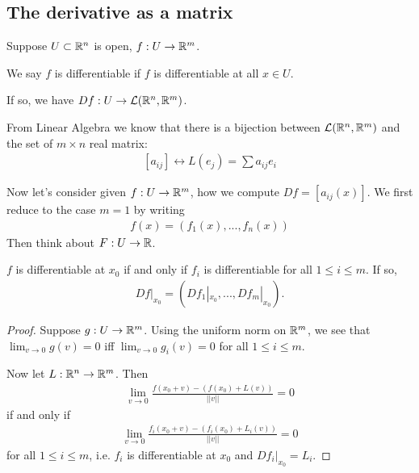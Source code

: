 \documentclass[a4paper]{article}
\begin{document}
\subsection{The derivative as a matrix}
Suppose $U \subset \mathbb{R}^n$ is open, $f:U \to \mathbb{R}^m$.

We say $f$ is differentiable if $f$ is differentiable at all $x \in U$.

If so, we have $Df:U \to \mathcal{L}(\mathbb{R}^n,\mathbb{R}^m)$.

From Linear Algebra we know that there is a bijection between $\mathcal{L}(\mathbb{R}^n,\mathbb{R}^m)$ and the set of $m\times n$ real matrix:
\begin{equation*}
\begin{aligned}
[a_{ij}] \longleftrightarrow L(e_j) = \sum a_{ij} e_i
\end{aligned}
\end{equation*}

Now let's consider given $f:U \to \mathbb{R}^m$, how we compute $Df=[a_{ij}(x)]$. We first reduce to the case $m=1$ by writing
\begin{equation*}
\begin{aligned}
f(x) = (f_1(x),...,f_n(x))
\end{aligned}
\end{equation*}
Then think about $F:U \to \mathbb{R}$.

\begin{prop}
$f$ is differentiable at $x_0$ if and only if $f_i$ is differentiable for all $1\leq i \leq m$. If so,
\begin{equation*}
\begin{aligned}
Df|_{x_0} = (Df_1|_{x_0},...,Df_m|_{x_0}).
\end{aligned}
\end{equation*}
\begin{proof}
Suppose $g: U \to \mathbb{R}^m$. Using the uniform norm on $\mathbb{R}^m$, we see that $\lim_{v\to 0} g(v) = 0$ iff $\lim_{v \to 0} g_i(v) = 0$ for all $1 \leq i \leq m$.

Now let $L: \mathbb{R}^n \to \mathbb{R}^m$. Then
\begin{equation*}
\begin{aligned}
\lim_{v\to 0} \frac{f(x_0+v)-(f(x_0)+L(v))}{||v||} = 0
\end{aligned}
\end{equation*}
if and only if
\begin{equation*}
\begin{aligned}
\lim_{v\to 0} \frac{f_i(x_0+v)-(f_i(x_0)+L_i(v))}{||v||} = 0
\end{aligned}
\end{equation*}
for all $1 \leq i \leq m$, i.e. $f_i$ is differentiable at $x_0$ and $Df_i|_{x_0} = L_i$.
\end{proof}
\end{prop}
\end{document}
